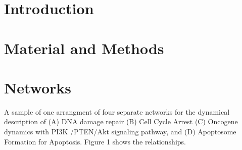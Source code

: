 \documentclass[preprint, 8pt]{elsarticle}
\theoremstyle{definition}
\begin{document}
	
\section{Introduction}

\section{Material and Methods}

\section{Networks}

A sample of one arrangment of four separate networks for the dynamical description of (A) DNA damage repair (B) Cell Cycle Arrest  (C) Oncogene dynamics with PI3K /PTEN/Akt signaling pathway, and (D) Apoptosome Formation for Apoptosis. Figure 1 shows the relationships. 
\end{document}
